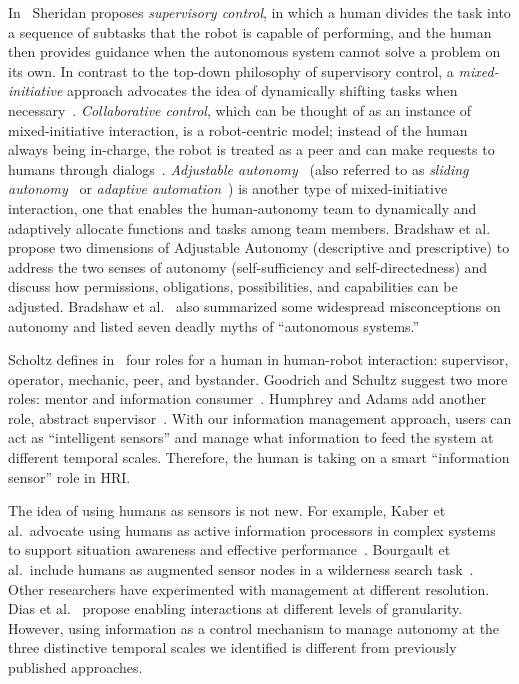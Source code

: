 In~\cite{Sheridan1992Telerobotics} Sheridan proposes \textit{supervisory control}, in which a human divides the task into a sequence of subtasks that the robot is capable of performing, and the human then provides guidance when the autonomous system cannot solve a problem on its own. In contrast to the top-down philosophy of supervisory control, a \textit{mixed-initiative} approach advocates the idea of dynamically shifting tasks when necessary~\cite{Hearst1999Mixed}. \textit{Collaborative control}, which can be thought of as an instance of mixed-initiative interaction, is a robot-centric model; instead of the human always being in-charge, the robot is treated as a peer and can make requests to humans through dialogs~\cite{Fong1999Collaborative}. \textit{Adjustable autonomy}~\cite{Dorais2001Designing} (also referred to as \textit{sliding autonomy}~\cite{Dias2008SlidingAutonomy} or \textit{adaptive automation}~\cite{Rouse1988Adaptive}) is another type of mixed-initiative interaction, one that enables the human-autonomy team to dynamically and adaptively allocate functions and tasks among team members. Bradshaw et al.\ \cite{Bradshaw2004Dimensions} propose two dimensions of Adjustable Autonomy (descriptive  and prescriptive) to address the two senses of autonomy (self-sufficiency and self-directedness) and discuss how permissions, obligations, possibilities, and capabilities can be adjusted. Bradshaw et al.\ \cite{Bradshaw2013Seven} also summarized some widespread misconceptions on autonomy and listed seven deadly myths of ``autonomous systems.''

Scholtz defines in~\cite{Steinfeld2006Common} four roles for a human in human-robot interaction: supervisor, operator, mechanic, peer, and bystander. Goodrich and Schultz suggest two more roles: mentor and information consumer~\cite{Goodrich2007HRISurvey}. Humphrey and Adams add another role, abstract supervisor~\cite{Humphrey2009Information}. With our information management approach, users can act as ``intelligent sensors'' and manage what information to feed the system at different temporal scales. Therefore, the human is taking on a smart ``information sensor'' role in HRI. 

The idea of using humans as sensors is not new. For example, Kaber et al.\ advocate using humans as active information processors in complex systems to support situation awareness and effective performance~\cite{Kaber2001Design}. Bourgault et al.\ include humans as augmented sensor nodes in a wilderness search task~\cite{Bourgault2008Human}. Other researchers have experimented with management at different resolution. Dias et al.\ \cite{Dias2008SlidingAutonomy} propose enabling interactions at different levels of granularity. However, using information as a control mechanism to manage autonomy at the three distinctive temporal scales we identified is different from previously published approaches.

